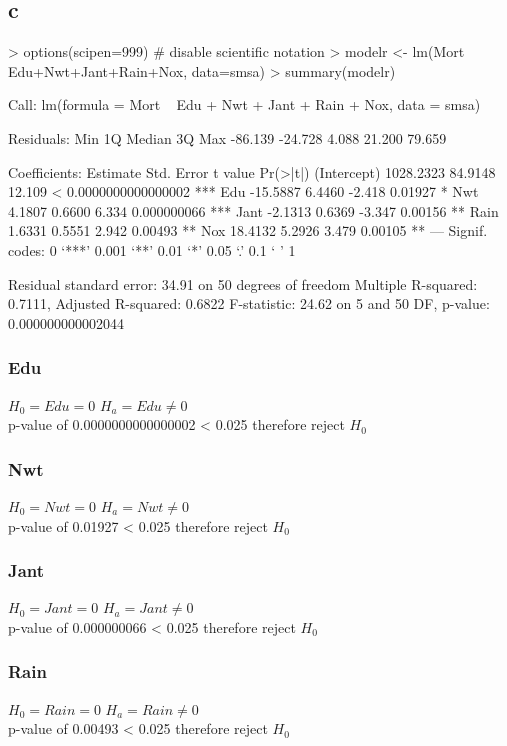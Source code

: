 \documentclass{article}
\begin{document}
\subsection*{c}
\begin{Schunk}
\begin{Sinput}
> options(scipen=999) # disable scientific notation
> modelr <- lm(Mort ~ Edu+Nwt+Jant+Rain+Nox, data=smsa)
> summary(modelr)
\end{Sinput}
\begin{Soutput}
Call:
lm(formula = Mort ~ Edu + Nwt + Jant + Rain + Nox, data = smsa)

Residuals:
    Min      1Q  Median      3Q     Max 
-86.139 -24.728   4.088  21.200  79.659 

Coefficients:
             Estimate Std. Error t value             Pr(>|t|)    
(Intercept) 1028.2323    84.9148  12.109 < 0.0000000000000002 ***
Edu          -15.5887     6.4460  -2.418              0.01927 *  
Nwt            4.1807     0.6600   6.334          0.000000066 ***
Jant          -2.1313     0.6369  -3.347              0.00156 ** 
Rain           1.6331     0.5551   2.942              0.00493 ** 
Nox           18.4132     5.2926   3.479              0.00105 ** 
---
Signif. codes:  0 ‘***’ 0.001 ‘**’ 0.01 ‘*’ 0.05 ‘.’ 0.1 ‘ ’ 1

Residual standard error: 34.91 on 50 degrees of freedom
Multiple R-squared:  0.7111,	Adjusted R-squared:  0.6822 
F-statistic: 24.62 on 5 and 50 DF,  p-value: 0.000000000002044
\end{Soutput}
\end{Schunk}
\subsubsection*{Edu}
$H_0=Edu=0$
$H_a=Edu \neq 0$
\\
p-value of 0.0000000000000002 < 0.025 therefore reject $H_0$
\subsubsection*{Nwt}
$H_0=Nwt=0$
$H_a=Nwt \neq 0$
\\
p-value of 0.01927 < 0.025 therefore reject $H_0$
\subsubsection*{Jant}
$H_0=Jant=0$
$H_a=Jant \neq 0$
\\
p-value of 0.000000066 < 0.025 therefore reject $H_0$
\subsubsection*{Rain}
$H_0=Rain=0$
$H_a=Rain \neq 0$
\\
p-value of 0.00493 < 0.025 therefore reject $H_0$
\end{document}
